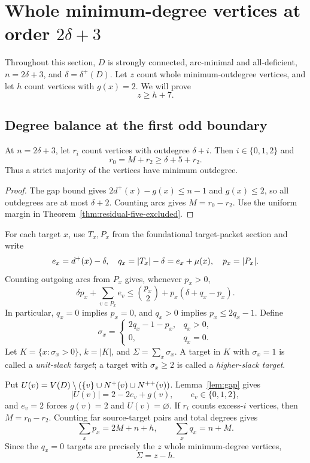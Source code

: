 \section{Whole minimum-degree vertices at order \texorpdfstring{$2\delta+3$}{2delta+3}}
\label{sec:wholecore}

Throughout this section, $D$ is strongly connected, arc-minimal and
all-deficient,
$n=2\delta+3$, and $\delta=\delta^+(D)$. Let $z$ count whole
minimum-outdegree vertices, and let $h$ count vertices with $g(x)=2$.
We will prove
\begin{equation}\label{eq:wholecore}
z\ge h+7.
\end{equation}


\subsection{Degree balance at the first odd boundary}
\begin{corollary}\label{cor:near}
At $n=2\delta+3$, let $r_i$ count vertices with outdegree $\delta+i$.
Then $i\in\{0,1,2\}$ and
\[
 r_0=M+r_2\ge\delta+5+r_2.
\]
Thus a strict majority of the vertices have minimum outdegree.
\end{corollary}
\begin{proof}
The gap bound gives $2d^+(x)-g(x)\le n-1$ and $g(x)\le2$, so all
outdegrees are at most $\delta+2$. Counting arcs gives $M=r_0-r_2$.
Use the uniform margin in Theorem~\ref{thm:residual-five-excluded}.
\end{proof}

For each target $x$, use $T_x,P_x$ from the foundational target-packet section and write
\[
e_x=d^+(x)-\delta,\quad q_x=|T_x|-\delta=e_x+\mu(x),\quad
p_x=|P_x|.
\]
Counting outgoing arcs from $P_x$ gives, whenever $p_x>0$,
\begin{equation}\label{eq:capacity}
\delta p_x+\sum_{v\in P_x}e_v
\le \binom{p_x}{2}+p_x(\delta+q_x-p_x).
\end{equation}
In particular, $q_x=0$ implies $p_x=0$, and $q_x>0$ implies
$p_x\le2q_x-1$. Define
\[
\sigma_x=
\begin{cases}
2q_x-1-p_x,&q_x>0,\\
0,&q_x=0.
\end{cases}
\]
Let $K=\{x:\sigma_x>0\}$, $k=|K|$, and
$\Sigma=\sum_x\sigma_x$. A target in $K$ with $\sigma_x=1$ is called
a \emph{unit-slack target}; a target with $\sigma_x\ge2$ is called
a \emph{higher-slack target}.

Put $U(v)=V(D)\setminus(\{v\}\cup N^+(v)\cup N^{++}(v))$.
Lemma~\ref{lem:gap} gives
\begin{equation}\label{eq:excess}
|U(v)|=2-2e_v+g(v),\qquad e_v\in\{0,1,2\},
\end{equation}
and $e_v=2$ forces $g(v)=2$ and $U(v)=\varnothing$.
If $r_i$ counts excess-$i$ vertices, then $M=r_0-r_2$.
Counting far source-target pairs and total degrees gives
\[
\sum_xp_x=2M+n+h,\qquad \sum_xq_x=n+M.
\]
Since the $q_x=0$ targets are precisely the $z$ whole minimum-degree
vertices,
\begin{equation}\label{eq:slacksum}
{\Sigma=z-h.}
\end{equation}

